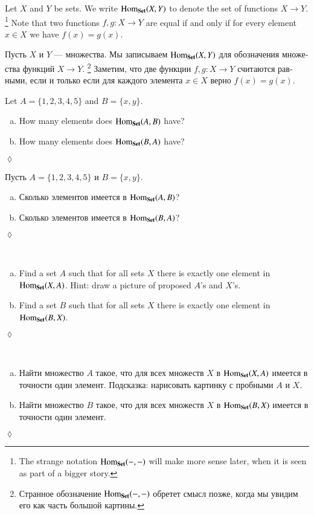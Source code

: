 \documentclass{book}
\def\tn{\textnormal}
\def\Hom{\tn{Hom}}
\def\to{\rightarrow}
\def\taking{\colon}
\def\Set{{\bf Set}}
\theoremstyle{theoremENG}
\theoremstyle{lemmaENG}
\theoremstyle{propositionENG}
\theoremstyle{corollaryENG}
\theoremstyle{factENG}
\theoremstyle{remarkENG}
\theoremstyle{exampleENG}
\theoremstyle{warningENG}
\theoremstyle{questionENG}
\theoremstyle{guessENG}
\theoremstyle{answerENG}
\theoremstyle{constructionENG}
\theoremstyle{rulesENG}
\theoremstyle{excENG}
\newtheorem{excENG}[subsubsection]{\begin{english}Exercise\end{english}}
\theoremstyle{appENG}
\theoremstyle{definitionENG}
\theoremstyle{notationENG}
\theoremstyle{conjectureENG}
\theoremstyle{postulateENG}
\newenvironment{exerciseENG}{\begin{excENG}}{\hspace*{\fill}$\lozenge$\end{excENG}}
\theoremstyle{theoremRUS}
\theoremstyle{lemmaRUS}
\theoremstyle{propositionRUS}
\theoremstyle{corollaryRUS}
\theoremstyle{factRUS}
\theoremstyle{remarkRUS}
\theoremstyle{exampleRUS}
\theoremstyle{warningRUS}
\theoremstyle{questionRUS}
\theoremstyle{guessRUS}
\theoremstyle{answerRUS}
\theoremstyle{constructionRUS}
\theoremstyle{rulesRUS}
\theoremstyle{excRUS}
\newtheorem{excRUS}[subsubsection]{\begin{russian}Упражнение\end{russian}}
\theoremstyle{appRUS}
\theoremstyle{definitionRUS}
\theoremstyle{notationRUS}
\theoremstyle{conjectureRUS}
\theoremstyle{postulateRUS}
\newenvironment{exerciseRUS}{\begin{excRUS}}{\hspace*{\fill}$\lozenge$\end{excRUS}}
\def\sexc{\begin{enumerate}[a.)]\setlength{\itemsep}{.1cm}\setlength{\parskip}{.1cm}\item}
\def\next{\item}
\def\endsexc{\end{enumerate}}
\begin{document}
\begin{english}
Let $X$ and $Y$ be sets. We write $\Hom_\Set(X,Y)$\index{a symbol!$\Hom_\Set$} to denote the set of functions $X\to Y$.
\footnote{The strange notation $\Hom_\Set(-,-)$ will make more sense later, when it is seen as part of a bigger story.} 
Note that two functions $f,g\taking X\to Y$ are equal if and only if for every element $x\in X$ we have $f(x)=g(x)$. 

\begin{russian}
Пусть $X$ и $Y$ — множества. Мы записываем $\Hom_\Set(X,Y)$\index{a symbol!$\Hom_\Set$} для обозначения множества функций $X\to Y$.
\footnote{Странное обозначение $\Hom_\Set(-,-)$ обретет смысл позже, когда мы увидим его как часть большой картины.} 
Заметим, что две функции $f,g\taking X\to Y$ считаются равными, если и только если для каждого элемента $x\in X$ верно $f(x)=g(x)$. 
\end{russian}

\begin{exerciseENG}
Let $A=\{1,2,3,4,5\}$ and $B=\{x,y\}.$ 
\sexc How many elements does $\Hom_\Set(A,B)$ have? 
\next How many elements does $\Hom_\Set(B,A)$ have?
\endsexc
\end{exerciseENG}

\begin{exerciseRUS}
\begin{russian}
Пусть $A=\{1,2,3,4,5\}$ и $B=\{x,y\}.$ 
\sexc Сколько элементов имеется в $\Hom_\Set(A,B)$? 
\next Сколько элементов имеется в $\Hom_\Set(B,A)$?
\endsexc
\end{russian}
\end{exerciseRUS}

\begin{exerciseENG}~
\sexc Find a set $A$ such that for all sets $X$ there is exactly one element in $\Hom_\Set(X,A)$. Hint: draw a picture of proposed $A$'s and $X$'s.
\next Find a set $B$ such that for all sets $X$ there is exactly one element in $\Hom_\Set(B,X)$.
\endsexc 
\end{exerciseENG}

\begin{exerciseRUS}~
\begin{russian}
\sexc Найти множество $A$ такое, что для всех множеств $X$ в $\Hom_\Set(X,A)$ имеется в точности один элемент. Подсказка: нарисовать картинку с пробными $A$ и $X$.
\next Найти множество $B$ такое, что для всех множеств $X$ в $\Hom_\Set(B,X)$ имеется в точности один элемент.
\endsexc 
\end{russian}
\end{exerciseRUS}


\end{english}
\end{document}
